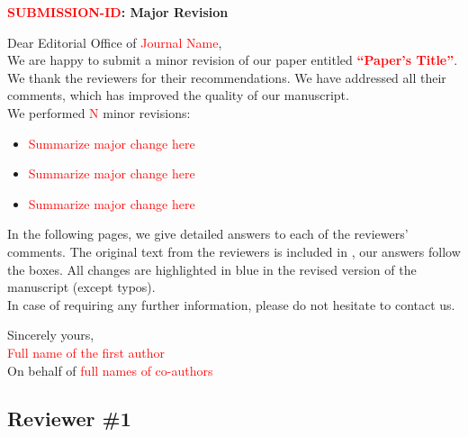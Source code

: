 \documentclass[a4paper]{article}
\newcommand{\modif}[1]{{\color{blue}#1}}
\begin{document}
\begin{center}
{\Large\bf \textcolor{red}{SUBMISSION-ID}: Major Revision}\\\vspace{4mm}
\end{center}

\noindent Dear Editorial Office of \textcolor{red}{Journal Name},\\

We are happy to submit a minor revision of our paper entitled \textcolor{red}{\textbf{“Paper's Title\textbf{”}}}.
We thank the reviewers for their recommendations.
We have addressed all their comments, which has improved the quality of our manuscript.\\

\noindent  We performed \textcolor{red}{N} minor revisions:

\begin{itemize}
    \item \textcolor{red}{Summarize major change here}
    \item \textcolor{red}{Summarize major change here}
    \item \textcolor{red}{Summarize major change here}
\end{itemize}

In the following pages, we give detailed answers to each of the reviewers' comments. The original text from the reviewers is included in , our answers follow the boxes. All changes are highlighted in \modif{blue} in the revised version of the manuscript (except typos).\\

\noindent In case of requiring any further information, please do not hesitate to contact us.\\

\bigbreak

\noindent  Sincerely yours,\\

\noindent \textcolor{red}{Full name of the first author}\\

\noindent On behalf of \textcolor{red}{full names of co-authors}

\newpage


\subsection*{Reviewer \#1}
\end{document}
